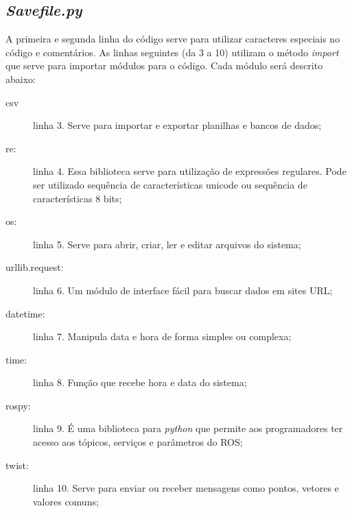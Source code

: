 \subsection{\textit{Savefile.py}}
\label{sec:Savefile.py}

	\begin{figure}[H]
		\centering
	\end{figure}
	
A primeira e segunda linha do código serve para utilizar caracteres especiais no código e comentários. As linhas seguintes (da 3 a 10) utilizam o método \textit{import} que serve para importar módulos para o código. Cada módulo será descrito abaixo:
\begin{description}
    \item[csv] linha 3. Serve para importar e exportar planilhas e bancos de dados;
    \item[re:] linha 4. Essa biblioteca serve para utilização de expressões regulares. Pode ser utilizado sequência de características unicode ou sequência de características 8 bits;
    \item[os:] linha 5. Serve para abrir, criar, ler e editar arquivos do sistema;
    \item[urllib.request:] linha 6. Um módulo de interface fácil para buscar dados em sites URL;
    \item[datetime:] linha 7. Manipula data e hora de forma simples ou complexa;
    \item[time:] linha 8. Função que recebe hora e data do sistema;
    \item[rospy:] linha 9. É uma biblioteca para \textit{python} que permite aos programadores ter acesso aos tópicos, serviços e parâmetros do ROS;
    \item[twist:] linha 10. Serve para enviar ou receber mensagens como pontos, vetores e valores comuns;
\end{description}

	\begin{figure}[H]
		\centering
\end{figure}
	
